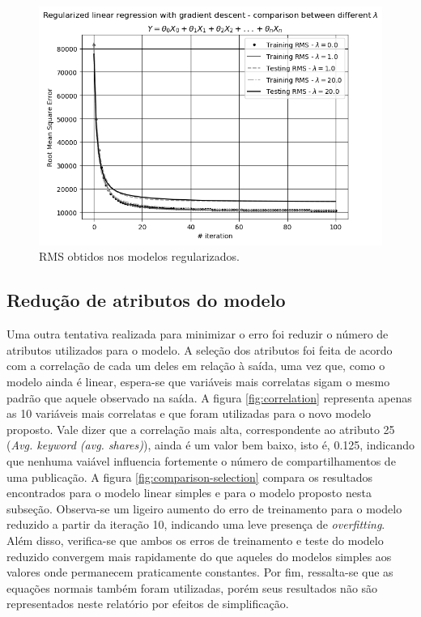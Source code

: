 \documentclass[10pt,twocolumn,letterpaper]{article}
\begin{document}
\begin{figure}
    \centering
    \includegraphics[width=0.9\columnwidth]{img/lr-comparation.png}
    \caption{RMS obtidos nos modelos regularizados.}
    \label{fig:reg-comparison}
\end{figure}

\subsection{Redução de atributos do modelo}

Uma outra tentativa realizada para minimizar o erro foi reduzir o número de atributos utilizados para o modelo. A seleção dos atributos foi feita de acordo com a correlação de cada um deles em relação à saída, uma vez que, como o modelo ainda é linear, espera-se que variáveis mais correlatas sigam o mesmo padrão que aquele observado na saída. A figura \ref {fig:correlation} representa apenas as 10 variáveis mais correlatas e que foram utilizadas para o novo modelo proposto. Vale dizer que a correlação mais alta, correspondente ao atributo 25 (\textit{Avg. keyword (avg. shares)}), ainda é um valor bem baixo, isto é, 0.125, indicando que nenhuma vaiável influencia fortemente o número de compartilhamentos de uma publicação. A figura \ref{fig:comparison-selection} compara os resultados encontrados para o modelo linear simples e para o modelo proposto nesta subseção. Observa-se um ligeiro aumento do erro de treinamento para o modelo reduzido a partir da iteração 10, indicando uma leve presença de \textit {overfitting}. Além disso, verifica-se que ambos os erros de treinamento e teste do modelo reduzido convergem mais rapidamente do que aqueles do modelos simples aos valores onde permanecem praticamente constantes. Por fim, ressalta-se que as equações normais também foram utilizadas, porém seus resultados não são representados neste relatório por efeitos de simplificação.
\end{document}
